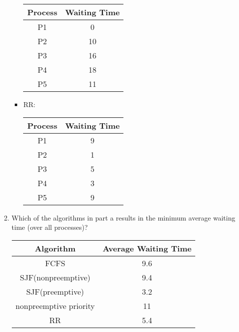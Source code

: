 \begin{enumerate}
\begin{enumerate}
\begin{itemize}
            \begin{center}
            \begin{tabular}{|c|c|}
                \hline
                Process & Waiting Time \\
                \hline
                P1 & 0 \\
                \hline
                P2 & 10 \\
                \hline
                P3 & 16 \\
                \hline
                P4 & 18 \\
                \hline
                P5 & 11 \\
                \hline
            \end{tabular}
            \end{center}
            
            \item RR:
            
            \begin{center}
            \begin{tabular}{|c|c|}
                \hline
                Process & Waiting Time \\
                \hline
                P1 & 9 \\
                \hline
                P2 & 1 \\
                \hline
                P3 & 5 \\
                \hline
                P4 & 3 \\
                \hline
                P5 & 9 \\
                \hline
            \end{tabular}
            \end{center}
            
        \end{itemize}
        
        \item Which of the algorithms in part a results in the minimum average waiting time (over all processes)?
        
        \begin{center}
        \begin{tabular}{|c|c|}
            \hline
            Algorithm & Average Waiting Time \\
            \hline
            FCFS & 9.6 \\
            \hline
            SJF(nonpreemptive) & 9.4 \\
            \hline
            SJF(preemptive) & 3.2 \\
            \hline
            nonpreemptive priority & 11 \\
            \hline
            RR & 5.4 \\
            \hline
        \end{tabular}
        \end{center}
    \end{enumerate}


\end{enumerate}
